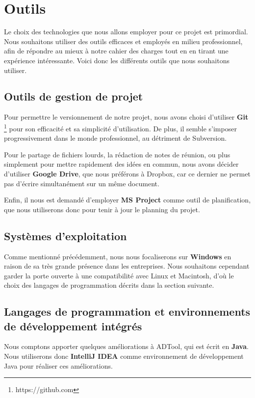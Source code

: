 \section{Outils}
    \label{sec:outils}
    Le choix des technologies que nous allons employer pour ce projet est primordial. Nous souhaitons utiliser des outils efficaces et employés en milieu professionnel, afin de répondre au mieux à notre cahier des charges tout en en tirant une expérience intéressante. Voici donc les différents outils que nous souhaitons utiliser.
         
    \subsection{Outils de gestion de projet}
        Pour permettre le versionnement de notre projet, nous avons choisi d'utiliser {\bf Git} \footnote{https://github.com} pour son efficacité et sa simplicité d'utilisation. De plus, il semble s'imposer progressivement dans le monde professionnel, au détriment de Subversion.
        
        Pour le partage de fichiers lourds, la rédaction de notes de réunion, ou plus simplement pour mettre rapidement des idées en commun, nous avons décider d'utiliser {\bf Google Drive}, que nous préférons à Dropbox, car ce dernier ne permet pas d'écrire simultanément sur un même document.

        Enfin, il nous est demandé d'employer {\bf MS Project} comme outil de planification, que nous utiliserons donc pour tenir à jour le planning du projet.

	\subsection{Systèmes d'exploitation}
	   Comme mentionné précédemment, nous nous focaliserons sur {\bf Windows} en raison de sa très grande présence dans les entreprises. Nous souhaitons cependant garder la porte ouverte à une compatibilité avec Linux et Macintosh, d'où le choix des langages de programmation décrits dans la section suivante.
	
    \subsection{Langages de programmation et environnements de développement intégrés}
        Nous comptons apporter quelques améliorations à ADTool, qui est écrit en {\bf Java}. Nous utiliserons donc {\bf IntelliJ IDEA} comme environnement de développement Java pour réaliser ces améliorations.
           
